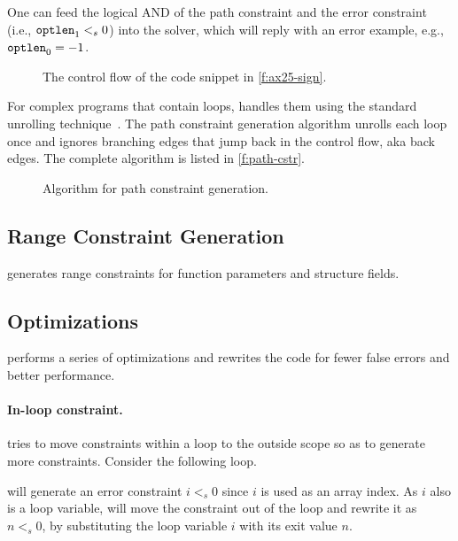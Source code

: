 One can feed the logical AND of the path constraint and the error
constraint (i.e., $\texttt{optlen}_1 <_s 0$) into the solver, which
will reply with an error example, e.g., $\texttt{optlen}_0 = -1$.

\begin{figure}
\centering
\resizebox{\linewidth}{!}{

}
\caption{The control flow of the code snippet in \autoref{f:ax25-sign}.}
\label{f:cfg}
\end{figure}

For complex programs that contain loops, \sys handles them using
the standard unrolling technique~\cite{xie:saturn}.  The path
constraint generation algorithm unrolls each loop once and ignores
branching edges that jump back in the control flow, aka back edges.
The complete algorithm is listed in \autoref{f:path-cstr}.

\begin{figure}

\caption{Algorithm for path constraint generation.}
\label{f:path-cstr}
\end{figure}

\subsection{Range Constraint Generation}
\label{s:gen:range}

\sys generates range constraints for function parameters
and structure fields.



\subsection{Optimizations}

\sys performs a series of optimizations and rewrites the code for
fewer false errors and better performance.

\paragraph{In-loop constraint.}
\sys tries to move constraints within a loop to the outside scope
so as to generate more constraints.  Consider the following loop.

\sys will generate an error constraint $i <_s 0$ since $i$ is used
as an array index.  As $i$ also is a loop variable, \sys will move
the constraint out of the loop and rewrite it as $n <_s 0$, by
substituting the loop variable $i$ with its exit value $n$.


